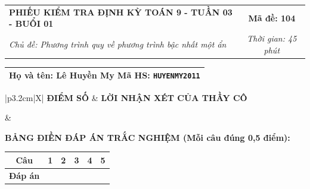 \documentclass[12pt,a4paper]{article}
\begin{document}
\newpage


\noindent
\begin{tabularx}{\linewidth}{|X|c|}
\hline
\textbf{PHIẾU KIỂM TRA ĐỊNH KỲ TOÁN 9 - TUẦN 03 - BUỔI 01} & \textbf{Mã đề: 104} \\
\textit{Chủ đề: Phương trình quy về phương trình bậc nhất một ẩn} & \textit{Thời gian: 45 phút} \\
\hline
\end{tabularx}

\vspace{1mm}

\noindent
\begin{tabularx}{\linewidth}{|X|}
\hline
\rule[-2mm]{0pt}{7.5mm}\textbf{Họ và tên:} \textbf{\large Lê Huyền My} \hfill \textbf{Mã HS:} \texttt{HUYENMY2011} \quad \\
\hline
\end{tabularx}

\vspace{1mm}

\noindent
\begin{tabularx}{\linewidth}{|p{3.2cm}|X|}
\hline
\centering\textbf{ĐIỂM SỐ} & \centering\textbf{LỜI NHẬN XÉT CỦA THẦY CÔ} \tabularnewline
\hline
\rule{0pt}{1.3cm} & \tabularnewline
\hline
\end{tabularx}

\vspace{1.2mm}

\noindent\textbf{BẢNG ĐIỀN ĐÁP ÁN TRẮC NGHIỆM (Mỗi câu đúng 0,5 điểm):}
\vspace{0.8mm}

\noindent
\renewcommand{\arraystretch}{1.35}
\begin{tabularx}{\linewidth}{|c|*{5}{>{\centering\arraybackslash}X|}}
\hline
\textbf{Câu} & \textbf{1} & \textbf{2} & \textbf{3} & \textbf{4} & \textbf{5} \\
\hline
\textbf{Đáp án} & & & & & \\
\hline
\end{tabularx}
\renewcommand{\arraystretch}{1.0}

\vspace{1.5mm}
\end{document}
